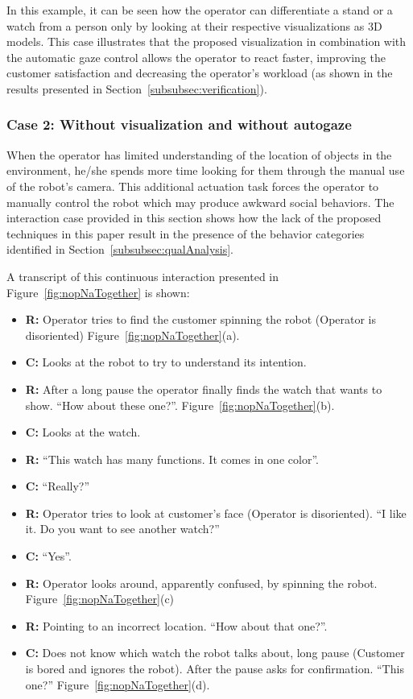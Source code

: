 \documentclass[journal]{IEEEtran}
\begin{document}
In this example, it can be seen how the operator can differentiate a stand or a watch from a person only by looking at their respective visualizations as 3D models.
This case illustrates that the proposed visualization in combination with the automatic gaze control allows the operator to react faster, improving the customer satisfaction and decreasing the operator's workload (as shown in the results presented in Section~\ref{subsubsec:verification}).


\subsubsection{Case 2: Without visualization and without autogaze}
When the operator has limited understanding of the location of objects in the environment, he/she spends more time looking for them through the manual use of the robot's camera.
This additional actuation task forces the operator to manually control the robot which may produce awkward social behaviors.
The interaction case provided in this section shows how the lack of the proposed techniques in this paper result in the presence of the behavior categories identified in Section~\ref{subsubsec:qualAnalysis}. 

A transcript of this continuous interaction presented in  Figure~\ref{fig:nopNaTogether} is shown:
\begin{itemize}
  \item[] {\bf R:} Operator tries to find the customer spinning the robot (Operator is disoriented) Figure~\ref{fig:nopNaTogether}(a).
  \item[] {\bf C:} Looks at the robot to try to understand its intention.
  \item[] {\bf R:} After a long pause the operator finally finds the watch that wants to show. ``How about these one?''. Figure~\ref{fig:nopNaTogether}(b).
  \item[] {\bf C:} Looks at the watch.
 \item[] {\bf R:} ``This watch has many functions. It comes in one color''.
 \item[] {\bf C:} ``Really?''
 \item[] {\bf R:} Operator tries to look at customer's face (Operator is disoriented). ``I like it. Do you want to see another watch?''
 \item[] {\bf C:} ``Yes''.
 \item[] {\bf R:} Operator looks around, apparently confused, by spinning the robot. Figure~\ref{fig:nopNaTogether}(c)
 \item[] {\bf R:} Pointing to an incorrect location. ``How about that one?''.
 \item[] {\bf C:} Does not know which watch the robot talks about, long pause (Customer is bored and ignores the robot). After the pause asks for confirmation. ``This one?'' Figure~\ref{fig:nopNaTogether}(d).
\end{itemize}
\end{document}

